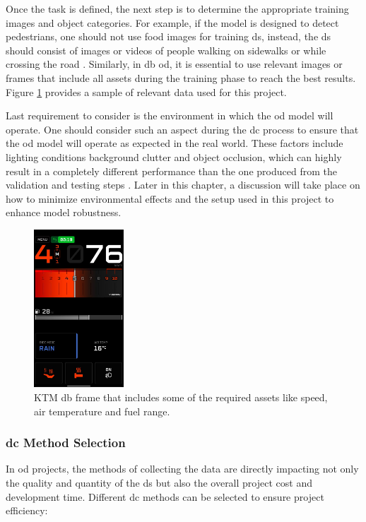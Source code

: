 Once the task is defined, the next step is to determine the appropriate training images and object categories. For example, if the model is designed to detect pedestrians, one should not use food images for training \gls{ds}, instead, the \gls{ds} should consist of images or videos of people walking on sidewalks or while crossing the road \cite{AIMultiple_Computer_Vision_Training_Data}. Similarly, in \gls{db} \gls{od}, it is essential to use relevant images or frames that include all assets during the training phase to reach the best results. Figure \ref{KTM_DB_Unlabelled} provides a sample of relevant data used for this project. 

Last requirement to consider is the environment in which the \gls{od} model will operate. One should consider such an aspect during the \gls{dc} process to ensure that the \gls{od} model will operate as expected in the real world. These factors include lighting conditions background clutter and object occlusion, which can highly result in a completely different performance than the one produced from the validation and testing steps \cite{AIMultiple_Computer_Vision_Training_Data}. Later in this chapter, a discussion will take place on how to minimize environmental effects and the setup used in this project to enhance model robustness.

\begin{figure}[!htb] 
    \centering
    \includegraphics[width=0.3\textwidth]{Figures/Portrait_MainScreenPSD.JPG}
    \caption{KTM \gls{db} frame that includes some of the required assets like speed, air temperature and fuel range.}
    \label{KTM_DB_Unlabelled}
\end{figure}

\subsubsection{\gls{dc} Method Selection}
In \gls{od} projects, the methods of collecting the data are directly impacting not only the quality and quantity of the \gls{ds} but also the overall project cost and development time. Different \gls{dc} methods can be selected to ensure project efficiency:

